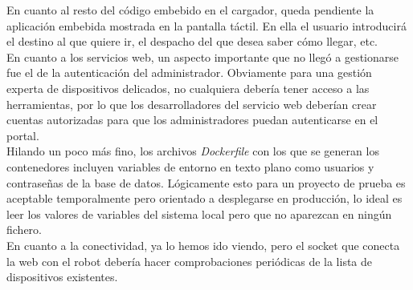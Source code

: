En cuanto al resto del código embebido en el cargador, queda pendiente la aplicación embebida mostrada en la pantalla táctil. En ella el usuario introducirá el destino al que quiere ir, el despacho del que desea saber cómo llegar, etc.\\

En cuanto a los servicios web, un aspecto importante que no llegó a gestionarse fue el de la autenticación del administrador. Obviamente para una gestión experta de dispositivos delicados, no cualquiera debería tener acceso a las herramientas, por lo que los desarrolladores del servicio web deberían crear cuentas autorizadas para que los administradores puedan autenticarse en el portal.\\

Hilando un poco más fino, los archivos \textit{Dockerfile} con los que se generan los contenedores incluyen variables de entorno en texto plano como usuarios y contraseñas de la base de datos. Lógicamente esto para un proyecto de prueba es aceptable temporalmente pero orientado a desplegarse en producción, lo ideal es leer los valores de variables del sistema local pero que no aparezcan en ningún fichero.\\

En cuanto a la conectividad, ya lo hemos ido viendo, pero el socket que conecta la web con el robot debería hacer comprobaciones periódicas de la lista de dispositivos existentes.\\
